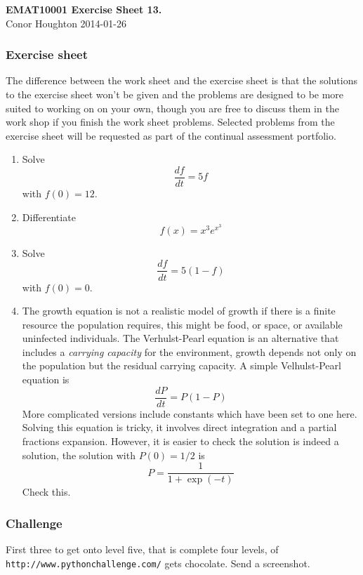 \documentclass[12pt]{article}
\begin{document}
\begin{center}
{\bf EMAT10001 Exercise Sheet 13.}\\[1cm]{} Conor Houghton 2014-01-26
\end{center}

\subsubsection*{Exercise sheet}

The difference between the work sheet and the exercise sheet is that
the solutions to the exercise sheet won't be given and the problems
are designed to be more suited to working on on your own, though you
are free to discuss them in the work shop if you finish the work sheet
problems. Selected problems from the exercise sheet will be requested
as part of the continual assessment portfolio.

\begin{enumerate}

\item Solve 
\begin{equation}
\frac{df}{dt}=5f
\end{equation}
with $f(0)=12$.

\item Differentiate 
\begin{equation}
f(x)=x^3e^{x^3}
\end{equation}

\item Solve
\begin{equation}
\frac{df}{dt}=5(1-f)
\end{equation}
with $f(0)=0$.

\item The growth equation is not a realistic model of growth if there
  is a finite resource the population requires, this might be food, or
  space, or available uninfected individuals. The Verhulst-Pearl
  equation is an alternative that includes a \textsl{carrying
    capacity} for the environment, growth depends not only on the
  population but the residual carrying capacity. A simple
  Velhulst-Pearl equation is
\begin{equation}
\frac{dP}{dt}=P(1-P)
\end{equation}
More complicated versions include constants which have been set to one here. Solving this equation is tricky, it involves direct integration and a partial fractions expansion. However, it is easier to check the solution is indeed a solution, the solution with $P(0)=1/2$ is
\begin{equation}
P=\frac{1}{1+\exp(-t)}
\end{equation}
Check this.
\end{enumerate}

\subsubsection*{Challenge}
First three to get onto level five, that is complete four levels, of \texttt{http://www.pythonchallenge.com/} gets chocolate. Send a screenshot.
\end{document}
